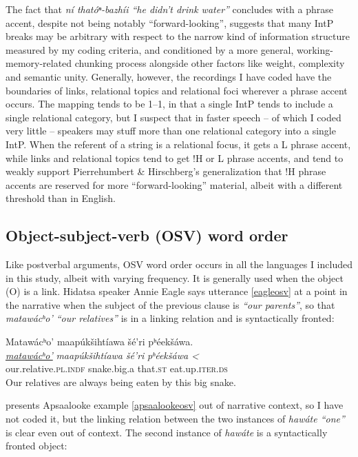 \documentclass[output=paper]{LSP/langsci}
\begin{document}
The fact that \emph{ní thatóⁿ-bazhíi “he didn’t drink water”} concludes with a phrase accent, despite not being notably “forward-looking”, suggests that many IntP breaks may be arbitrary with respect to the narrow kind of information structure measured by my coding criteria, and conditioned by a more general, working-memory-related chunking process alongside other factors like weight, complexity and semantic unity. Generally, however, the recordings I have coded have the boundaries of links, relational topics and relational foci wherever a phrase accent occurs. The mapping tends to be 1--1, in that a single IntP tends to include a single relational category, but I suspect that in faster speech -- of which I coded very little -- speakers may stuff more than one relational category into a single IntP. When the referent of a string is a relational focus, it gets a L phrase accent, while links and relational topics tend to get !H or L phrase accents, and tend to weakly support Pierrehumbert \& Hirschberg’s \citeyearpar{PierrehumbertHirschberg1990} generalization that !H phrase accents are reserved for more “forward-looking” material, albeit with a different threshold than in English.

\subsection{Object-subject-verb (OSV) word order}\label{osv}

Like postverbal arguments, OSV word order occurs in all the languages I included in this study, albeit with varying frequency. It is generally used when the object (O) is a link. Hidatsa speaker Annie Eagle says utterance \ref{eagleosv} at a point in the narrative when the subject of the previous clause is ‎\emph{“our parents”}, so that \emph{matawácʰo’ “our relatives”} is in a linking relation and is syntactically fronted:

\ea\label{eagleosv}
Matawácʰo’ maapúkšihtíawa šé’ri pʰéekšáwa.\footnotemark\\
\gll	\emph{\underline{matawácʰo’}}		\emph{maapúkšihtíawa} 	\emph{šé’ri} 	\emph{pʰéekšáwa <}\\
	our.relative.\textsc{pl.indf} 		snake.big.a 			that.\textsc{st} 	eat.up.\textsc{iter.ds}\\
\glt	Our relatives are always being eaten by this big snake.
\z

\citet[102]{Graczyk1991a} presents Apsaalooke example \ref{apsaalookeosv} out of narrative context, so I have not coded it, but the linking relation between the two instances of \emph{hawáte “one”} is clear even out of context. The second instance of \emph{hawáte} is a syntactically fronted object:
\end{document}
